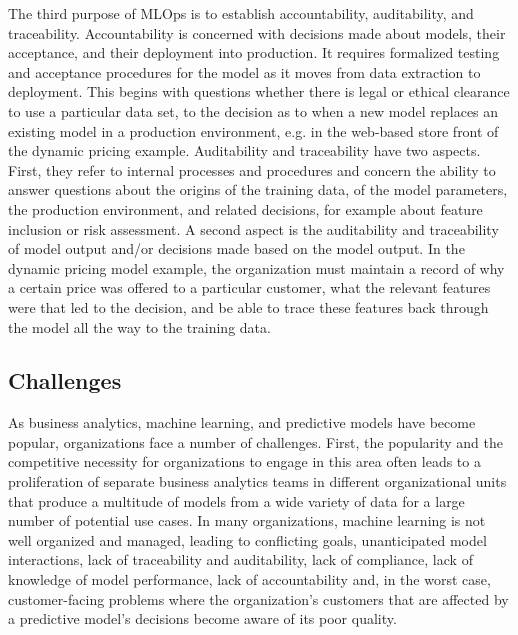 The third purpose of MLOps is to establish accountability, auditability, and traceability. Accountability is concerned with decisions made about models, their acceptance, and their deployment into production. It requires formalized testing and acceptance procedures for the model as it moves from data extraction to deployment. This begins with questions whether there is legal or ethical clearance to use a particular data set, to the decision as to when a new model replaces an existing model in a production environment, e.g. in the web-based store front of the dynamic pricing example. Auditability and traceability have two aspects. First, they refer to internal processes and procedures and concern the ability to answer questions about the origins of the training data, of the model parameters, the production environment, and related decisions, for example about feature inclusion or risk assessment. A second aspect is the auditability and traceability of model output and/or decisions made based on the model output. In the dynamic pricing model example, the organization must maintain a record of why a certain price was offered to a particular customer, what the relevant features were that led to the decision, and be able to trace these features back through the model all the way to the training data. 

\subsection*{Challenges}

As business analytics, machine learning, and predictive models have become popular, organizations face a number of challenges. First, the popularity and the competitive necessity for organizations to engage in this area often leads to a proliferation of separate business analytics teams in different organizational units that produce a multitude of models from a wide variety of data for a large number of potential use cases. In many organizations, machine learning is not well organized and managed, leading to conflicting goals, unanticipated model interactions, lack of traceability and auditability, lack of compliance, lack of knowledge of model performance, lack of accountability and, in the worst case, customer-facing problems where the organization's customers that are affected by a predictive model's decisions become aware of its poor quality. 


